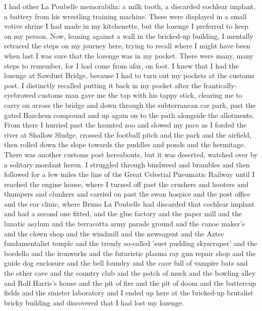 I had other La Poubelle memorabilia: a milk tooth, a discarded cochlear implant, a battery from his wrestling training machine. These were displayed in a small votive shrine I had made in my kitchenette, but the lozenge I preferred to keep on my person. Now, leaning against a wall in the bricked-up building, I mentally retraced the steps on my journey here, trying to recall where I might have been when last I was sure that the lozenge was in my pocket. There were many, many steps to remember, for I had come from afar, on foot. I knew that I had the lozenge at Sawdust Bridge, because I had to turn out my pockets at the customs post. I distinctly recalled putting it back in my pocket after the frantically-eyebrowed customs man gave me the tap with his tappy stick, clearing me to carry on across the bridge and down through the subterranean car park, past the gated Hazchem compound and up again on to the path alongside the allotments. From there I hurried past the haunted zoo and slowed my pace as I forded the river at Shallow Sludge, crossed the football pitch and the park and the airfield, then rolled down the slope towards the puddles and ponds and the hermitage. There was another customs post hereabouts, but it was deserted, watched over by a solitary mordant heron. I struggled through bindweed and brambles and then followed for a few miles the line of the Great Celestial Pneumatic Railway until I reached the engine house, where I turned off past the crushers and hooters and thumpers and clunkers and carried on past the swan hospice and the post office and the ear clinic, where Bruno La Poubelle had discarded that cochlear implant and had a second one fitted, and the glue factory and the paper mill and the lunatic asylum and the terracotta army parade ground and the canoe maker's and the clown shop and the windmill and the newsagent and the Aztec fundamentalist temple and the trendy so-called 'suet pudding skyscraper' and the bordello and the ironworks and the futuristic plasma ray gun repair shop and the guide dog enclosure and the bell foundry and the cave full of vampire bats and the other cave and the country club and the patch of muck and the bowling alley and Rolf Harris's house and the pit of fire and the pit of doom and the buttercup fields and the sinister laboratory and I ended up here at the bricked-up brutalist bricky building and discovered that I had lost my lozenge.

